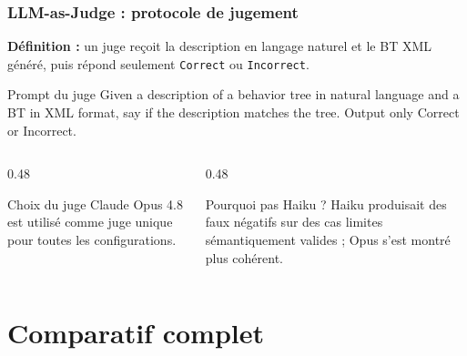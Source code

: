\documentclass[aspectratio=169]{beamer}
\begin{document}
\begin{frame}
  \frametitle{LLM-as-Judge : protocole de jugement}

  \small
  \textbf{Définition :} un juge reçoit la description en langage naturel et le BT XML généré, puis répond seulement \texttt{Correct} ou \texttt{Incorrect}.

  \vspace{0.5em}
  \begin{block}{Prompt du juge}
    \ttfamily\scriptsize
    Given a description of a behavior tree in natural language and a BT in XML format, say if the description matches the tree. Output only Correct or Incorrect.
  \end{block}

  \vspace{0.4em}
  \begin{columns}[T]
    \begin{column}{0.48\textwidth}
      \begin{block}{Choix du juge}
        \small
        Claude Opus 4.8 est utilisé comme juge unique pour toutes les configurations.
      \end{block}
    \end{column}
    \begin{column}{0.48\textwidth}
      \begin{block}{Pourquoi pas Haiku ?}
        \small
        Haiku produisait des faux négatifs sur des cas limites sémantiquement valides ; Opus s'est montré plus cohérent.
      \end{block}
    \end{column}
  \end{columns}
\end{frame}

\section{Comparatif complet}
\end{document}
